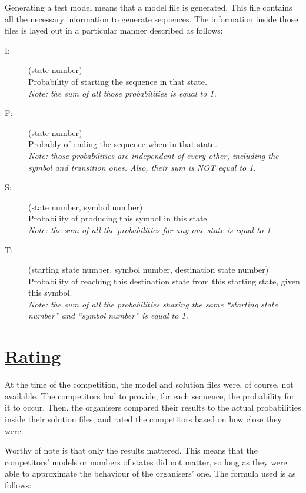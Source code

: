 \enskip{}\enskip{}\enskip{}Generating a test model means that a
model file is generated. This file contains all the necessary information
to generate sequences. The information inside those files is layed
out in a particular manner described as follows:
\begin{description}
\item [{I:}] (state number)\\
Probability of starting the sequence in that state.\\
\textit{Note: the sum of all those probabilities is equal to 1.}
\item [{F:}] (state number)\\
Probably of ending the sequence when in that state\textit{.}\\
\textit{Note: those probabilities are independent of every other,
including the symbol and transition ones. Also, their sum is NOT equal
to 1.}
\item [{S:}] (state number, symbol number)\\
Probability of producing this symbol in this state.\\
\textit{Note: the sum of all the probabilities for any one state is
equal to 1.}
\item [{T:}] (starting state number, symbol number, destination state number)\\
Probability of reaching this destination state from this starting
state, given this symbol.\\
\textit{Note: the sum of all the probabilities sharing the same ``starting
state number'' and ``symbol number'' is equal to 1.}
\end{description}

\part*{{\large{}\uline{Rating}}}

\enskip{}\enskip{}\enskip{}At the time of the competition, the
model and solution files were, of course, not available. The competitors
had to provide, for each sequence, the probability for it to occur.
Then, the organisers compared their results to the actual probabilities
inside their solution files, and rated the competitors based on how
close they were.

Worthy of note is that only the results mattered. This means that
the competitors\textquoteright{} models or numbers of states did not
matter, so long as they were able to approximate the behaviour of
the organisers\textquoteright{} one. The formula used is as follows:

